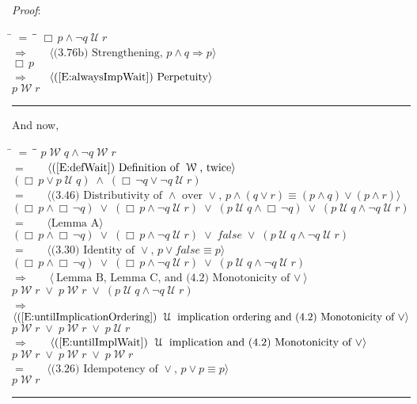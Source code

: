 \documentclass[12pt, fleqn, leqno]{article}
\newcommand{\lgap}{2pt}                             %
\newcommand{\mymathindent}{24pt}                    %
\newcommand{\impl}{\ensuremath{\Rightarrow}}        %
\newcommand{\Until}{\;\mathcal{U}\;}
\newcommand{\Wait}{\;\mathcal{W}\;}
\newcommand{\Always}{\Box\,}
\newcommand{\myqed}{\rule[-.23ex]{1.2ex}{2.0ex}}
\newcommand{\myqedtab}{\hspace{384pt}}              %
\newcommand{\Gll} {\langle}                         %
\newcommand{\Ggg} {\rangle}                         %
\newcommand{\Hint}[1]     {\ \ \ $\Gll              \mbox{#1} \Ggg$ }   %
\begin{document}
\emph{Proof}:
\begin{tabbing}
\hspace{\mymathindent} \= $= \;$ \= \myqedtab \= \kill
  \> \>   $\Always p \land \neg q\Until r$\\[\lgap]
  \> $\impl$  \>  \Hint{(3.76b) Strengthening, $p\land q \impl p$}\\[\lgap]
  \> \>   $\Always p$\\[\lgap]
  \> $\impl$ \> \Hint{(\ref{E:alwaysImpWait}) Perpetuity} \\[\lgap]
  \> \>   $p\Wait r$ \quad \myqed
\end{tabbing}
And now,
\begin{tabbing}
\hspace{\mymathindent} \= $= \;$ \= \myqedtab \= \kill
  \> \>   $p \Wait q \land \neg q \Wait r$\\[\lgap]
  \> $=$ \> \Hint{(\ref{E:defWait}) Definition of $\Wait$, twice} \\[\lgap]
  \> \>   $(\Always p\lor p\Until q) \;\land\; (\Always \neg q \lor \neg q \Until r)$\\[\lgap]
  \> $=$  \>  \Hint{(3.46) Distributivity of $\land$ over $\lor$, $p\land (q\lor r)\equiv (p\land q)\lor (p\land r)$}\\[\lgap]
  \> \>   $(\Always p\land \Always \neg q) \;\lor\; (\Always p\land \neg q\Until r) \;\lor\; (p\Until q\land \Always \neg q) \;\lor\; (p\Until q\land \neg q\Until r)$\\[\lgap]
  \> $=$  \>  \Hint{Lemma A}\\[\lgap]
  \> \>   $(\Always p\land \Always \neg q) \;\lor\; (\Always p\land \neg q\Until r) \;\lor\; false \;\lor\; (p\Until q\land \neg q\Until r)$\\[\lgap]
  \> $=$ \> \Hint{(3.30) Identity of $\lor$, $p\lor false\equiv p$} \\[\lgap]
  \> \>   $(\Always p\land \Always \neg q) \;\lor\; (\Always p\land \neg q\Until r) \;\lor\; (p\Until q\land \neg q\Until r)$\\[\lgap]
  \> $\impl$  \>  \Hint{Lemma B, Lemma C, and (4.2) Monotonicity of $\lor$}\\[\lgap]
  \> \>   $p\Wait r \;\lor\; p\Wait r \;\lor\; (p\Until q\land \neg q\Until r)$\\[\lgap]
  \> $\impl$  \>  \Hint{(\ref{E:untilImplicationOrdering}) $\Until$ implication ordering and (4.2) Monotonicity of $\lor$}\\[\lgap]
  \> \>   $p\Wait r \;\lor\; p\Wait r \;\lor\; p\Until r$\\[\lgap]
  \> $\impl$  \>  \Hint{(\ref{E:untilImplWait}) $\Until$ implication and (4.2) Monotonicity of $\lor$}\\[\lgap]
  \> \>   $p\Wait r \;\lor\; p\Wait r \;\lor\; p\Wait r$\\[\lgap]
  \> $=$ \> \Hint{(3.26) Idempotency of $\lor$, $p \lor p \equiv p$} \\[\lgap]
  \> \>   $p\Wait r$ \quad \myqed
\end{tabbing}
\end{document}

